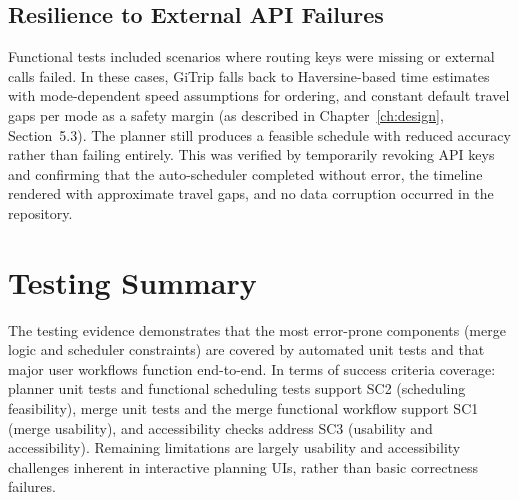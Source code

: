 \subsection{Resilience to External API Failures}
Functional tests included scenarios where routing keys were missing or external
calls failed. In these cases, GiTrip falls back to Haversine-based time estimates
with mode-dependent speed assumptions for ordering, and constant default travel
gaps per mode as a safety margin (as described in Chapter~\ref{ch:design},
Section~5.3). The planner still produces a feasible schedule with reduced
accuracy rather than failing entirely. This was verified by temporarily revoking
API keys and confirming that the auto-scheduler completed without error, the
timeline rendered with approximate travel gaps, and no data corruption occurred
in the repository.

\section{Testing Summary}
The testing evidence demonstrates that the most error-prone components (merge
logic and scheduler constraints) are covered by automated unit tests and that
major user workflows function end-to-end. In terms of success criteria coverage:
planner unit tests and functional scheduling tests support SC2 (scheduling
feasibility), merge unit tests and the merge functional workflow support SC1
(merge usability), and accessibility checks address SC3 (usability and
accessibility). Remaining limitations are largely
usability and accessibility challenges inherent in interactive planning UIs,
rather than basic correctness failures.
